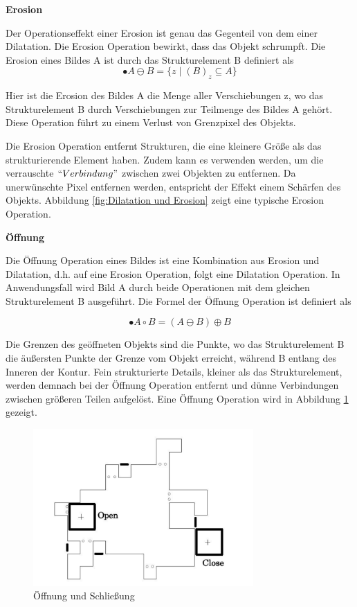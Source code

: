 \textbf{Erosion}

Der Operationseffekt einer Erosion ist genau das Gegenteil von dem einer Dilatation. Die Erosion Operation bewirkt, dass das Objekt schrumpft. Die Erosion eines Bildes A ist durch das Strukturelement B definiert als 
\begin{equation}
•A \ominus B =\lbrace z \mid (B)_z \subseteq A \rbrace  
\end{equation}

Hier ist die Erosion des Bildes A die Menge aller Verschiebungen z, wo das Strukturelement B durch Verschiebungen zur Teilmenge des Bildes A gehört. Diese Operation führt zu einem Verlust von Grenzpixel des Objekts.

Die Erosion Operation entfernt Strukturen, die eine kleinere Größe als das strukturierende Element haben. Zudem kann es verwenden werden, um die verrauschte $ ``Verbindung" $ zwischen zwei Objekten zu entfernen. Da unerwünschte Pixel entfernen werden, entspricht der Effekt einem Schärfen des Objekts. Abbildung \ref{fig:Dilatation und Erosion} zeigt eine typische Erosion Operation.


\textbf{Öffnung}

Die Öffnung Operation eines Bildes ist eine Kombination aus Erosion und Dilatation, d.h. auf eine Erosion Operation, folgt eine Dilatation Operation. In Anwendungsfall wird Bild A durch beide Operationen mit dem gleichen Strukturelement B ausgeführt. Die Formel der Öffnung Operation ist definiert als

\begin{equation}
•A \circ B =( A \ominus B )\oplus B  
\end{equation}

Die Grenzen des geöffneten Objekts sind die Punkte, wo das Strukturelement B die äußersten Punkte der Grenze vom Objekt erreicht, während B entlang des Inneren der Kontur. Fein strukturierte Details, kleiner als das Strukturelement, werden demnach bei der Öffnung Operation entfernt und dünne Verbindungen zwischen größeren Teilen aufgelöst. Eine Öffnung Operation wird in Abbildung \ref{fig:oeffnungundschliessung} gezeigt.

\begin{figure}[H]
 \centering 
  \includegraphics[keepaspectratio,width=0.75\textwidth]{images/4_ZweiteErfahrung/Morphological/oeffnungundschliessung.pdf}
 \caption{Öffnung und Schließung}
 \label{fig:oeffnungundschliessung}
\end{figure} 

